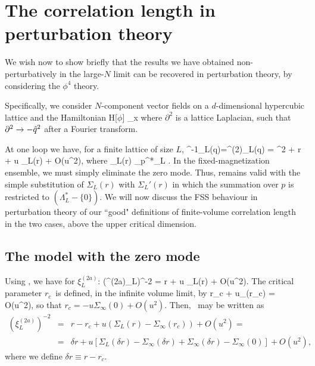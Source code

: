 \documentclass[12pt]{article}
\begin{document}
\section{The correlation length in perturbation theory} \label{sec4}

\newcommand{\res}{\mbox{\cal{Res}}}
\newcommand{\bgreek}[1]{\mbox{\boldmath$#1$}}
\newcommand{\bphi}{\mbox{\boldmath$\phi$}}
\newcommand{\dr}{\delta r}
%
We wish now to show briefly that the results we have obtained non-perturbatively
in the large-$N$ limit can be recovered in perturbation theory, 
by considering the $\phi^4$ theory. 

Specifically, we consider $N$-component vector fields on a 
$d$-dimensional hypercubic lattice and the Hamiltonian
\be
H[\bphi] \equiv \sum_{x} \left[ 
 - \frac{1}{2}  \bphi_x\cdot\partial^2 \bphi_x + 
  \frac{1}{2}r \bphi_x\cdot\bphi_x +\frac{u}{4!}(\bphi_x\cdot\bphi_x)^2\right]
\ee
where $\partial^2$ is a lattice Laplacian, such that $\partial^2\to -\hat{q}^2$ 
after a Fourier transform.

At one loop we have, for a finite lattice of size $L$,
\be
{}^{-1}_L(q)=\Gamma^{(2)}_L(q) = 
^2 + r + u \Sigma_L(r) + O(u^2),
\label{oneloop}
\ee
where 
\be
\Sigma_L(r) \equiv 
{}  \sum_{p\in\Lambda^*_L} .
\ee
In the fixed-magnetization ensemble, we must simply eliminate the 
zero mode. Thus,  remains valid with the simple 
substitution of $\Sigma_L(r)$ with $\Sigma_L'(r)$ in which the 
summation over $p$ is restricted to $(\Lambda^*_L - \{0\})$.
We will now discuss the FSS behaviour in perturbation theory of our 
``good" definitions of finite-volume correlation length in the two cases,
above the upper critical dimension.

\subsection{The model with the zero mode}

Using , we have for $\xi_L^{(2a)}$:
\be
\left(\xi^{(2a)}_L\right)^{-2} = r + u \Sigma_L(r) + O(u^2).
\label{GBS4}
\ee
The critical parameter $r_c$\ is defined, 
in the infinite volume limit, by
\be
        r_c + u\Sigma_\infty(r_c) = O(u^2),
\ee
so that $r_c = -u\Sigma_\infty(0) + O(u^2)$.
Then, \ may be written as
\begin{eqnarray}
\left(\xi^{(2a)}_L\right)^{-2} &=& 
r-r_c + u (\Sigma_L(r)-\Sigma_\infty(r_c)) + O(u^2) =
\nonumber\\ 
                    &=& \dr + 
u [\Sigma_L(\dr)-\Sigma_\infty(\dr) + 
   \Sigma_\infty(\dr) - \Sigma_\infty(0)] + O(u^2),
\end{eqnarray}
where we define $\dr \equiv r - r_c$.
\end{document}

